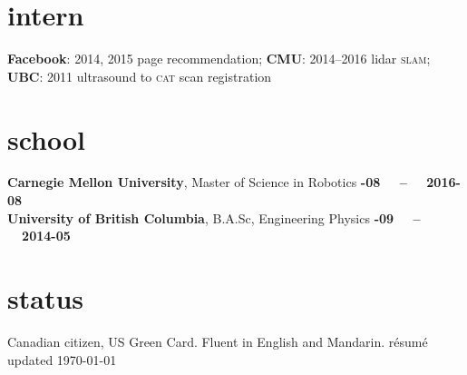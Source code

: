 \documentclass[margin,9pt]{res}
\begin{document}
\begin{resume}
\section{\sc \lsstyle intern}
    \textbf{Facebook}: 2014, 2015 page recommendation; \textbf{CMU}: 2014--2016 lidar \textsc{slam}; \textbf{UBC}: 2011 ultrasound to \textsc{cat} scan registration
\section{\sc \lsstyle school}
    \textbf{Carnegie Mellon University}, Master of Science in Robotics \hfill \textsc{\bfseries{}-08~~ -- ~~2016-08}\\
    \textbf{University of British Columbia}, B.A.Sc, Engineering Physics \hfill \textsc{\bfseries{}-09~~ -- ~~2014-05}
\section{\sc \lsstyle status}
    Canadian citizen, US Green Card. Fluent in English and Mandarin. \hfill {\tiny résumé updated \today}
\end{resume}
\end{document}
